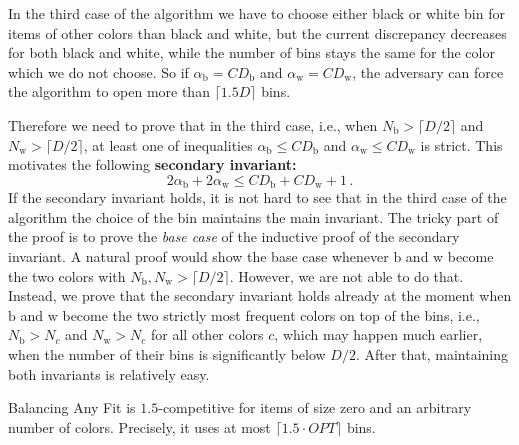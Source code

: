 \documentclass[11pt,a4paper]{article}
\def\vari#1{\mathit{#1}}
\begin{document}
In the third case of the algorithm we have to choose either black or
white bin for items of other colors than black and white, but the
current discrepancy decreases for both black and white, while the
number of bins stays the same for the color which we do not choose.
So if $\alpha_{\mathrm{b}} = \vari{CD}_{\mathrm{b}}$ and
$\alpha_{\mathrm{w}} = \vari{CD}_{\mathrm{w}}$, the adversary can
force the algorithm to open more than $\lceil 1.5D\rceil$ bins.

Therefore we need to prove that in the third case, i.e., when
$N_{\mathrm{b}} > \lceil D/2\rceil$ and $N_{\mathrm{w}} > \lceil
D/2\rceil$, at least one of inequalities $\alpha_{\mathrm{b}} \leq
\vari{CD}_{\mathrm{b}}$ and $\alpha_{\mathrm{w}} \leq
\vari{CD}_{\mathrm{w}}$ is strict. This motivates the following
\textbf{secondary invariant:} 
\begin{equation} \label{eq:secondaryInvariant}
2\alpha_{\mathrm{b}} + 2\alpha_{\mathrm{w}} \leq \vari{CD}_{\mathrm{b}} + \vari{CD}_{\mathrm{w}} + 1\,.
\end{equation}
If the secondary invariant holds, it is not hard to see that in the third
case of the algorithm the choice of the bin maintains the main
invariant. The tricky part of the proof is to prove the {\em base
case} of the inductive proof of the secondary invariant.
A natural proof would show the base case
whenever ${\mathrm{b}}$ and ${\mathrm{w}}$ become the two colors with
$N_{\mathrm{b}},N_{\mathrm{w}} > \lceil D/2\rceil$. However, we are
not able to do that. Instead, 
we prove that the secondary invariant
holds already at the moment when ${\mathrm{b}}$ and ${\mathrm{w}}$
become the two strictly most frequent colors on top of the bins, i.e.,
$N_{\mathrm{b}} > N_c$ and $N_{\mathrm{w}} > N_c$ for all other colors $c$, which may
happen much earlier, when the number of their bins is significantly below $D/2$. 
After that, maintaining both invariants is relatively easy.

\begin{theorem} \label{thm:optAlg}
Balancing Any Fit is $1.5$-com\-pe\-ti\-ti\-ve for items of
size zero and an arbitrary number of colors. Precisely, it uses at most
$\lceil 1.5 \cdot \vari{OPT}\rceil$ bins.
\end{theorem}
\end{document}
